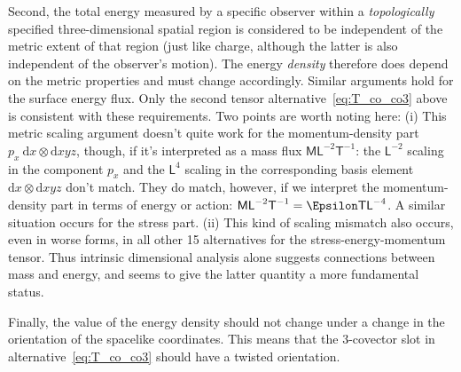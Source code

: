 \documentclass[\ifafour a4paper,12pt,\else a5paper,10pt,\fi%
onecolumn,oneside,article,%
british%
]{memoir}
\theoremstyle{remark}
\theoremstyle{innote}
\newcommand*{\citep}{\footcites}
\newcommand*{\di}{\mathrm{d}}%
\renewcommand*{\|}[1][]{\nonscript\,#1\vert\nonscript\;\mathopen{}}
\newcommand*{\sect}{\S}%
\newcommand*{\cf}{{cf.}}
\newcommand*{\Le}{\textsf{L}}
\newcommand*{\Ti}{\textsf{T}}
\newcommand*{\Ma}{\textsf{M}}
\newcommand*{\En}{\Epsilon}%
\newcommand*{\en}{\epsilon}
\newcommand*{\yp}{p}
\begin{document}
Second, the total energy measured by a specific observer within a
\emph{topologically} specified three-dimensional spatial region is
considered to be independent of the metric extent of that region (just like
charge, although the latter is also independent of the observer's
motion). %
The energy \emph{density} therefore does depend on the metric properties
and must change accordingly. Similar arguments hold for the surface energy
flux. Only the second tensor alternative~\eqref{eq:T_co_co3} above is
consistent with these requirements. Two points are worth noting here: (i)
This metric scaling argument doesn't quite work for the momentum-density
part $\yp_{x}\ \di x\otimes\di xyz$, though, if it's interpreted as a mass
flux $\Ma\Le^{-2}\Ti^{-1}$: the $\Le^{-2}$ scaling in the component
$\yp_{x}$ and the $\Le^{4}$ scaling in the corresponding basis element
$\di x\otimes\di xyz$ don't match. They do match, however, if we interpret
the momentum-density part in terms of energy or action:
$\Ma\Le^{-2}\Ti^{-1}=\En\Ti\Le^{-4}$. A similar situation occurs for the
stress part. (ii) This kind of scaling mismatch also occurs, even in worse
forms, in all other 15 alternatives for the stress-energy-momentum tensor.
Thus intrinsic dimensional analysis alone suggests connections between mass
and energy, and seems to give the latter quantity a more fundamental
status.

Finally, the value of the energy density should not change under a change
in the orientation of the spacelike coordinates. This means that the
3-covector slot in alternative~\eqref{eq:T_co_co3} should have a twisted
orientation.

\medskip
\end{document}
